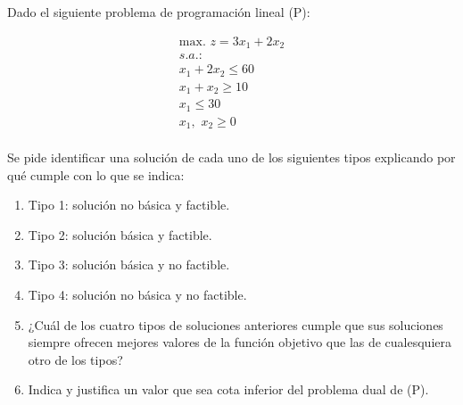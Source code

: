 Dado el siguiente problema de programación lineal (P):


\begin{equation}
\begin{split}
\mbox{max. } z = 3x_1 + 2x_2\\
s.a.:\\
x_1 + 2x_2 \leq 60\\
x_1 + x_2 \geq 10\\
x_1 \leq 30\\
x_1,\,\,x_2\geq 0\\
\end{split}
\end{equation}

Se pide identificar una solución de cada uno de los siguientes tipos explicando por qué cumple con lo que se indica:
\begin{enumerate}
    \item Tipo 1: solución no básica y factible.
    \item Tipo 2: solución básica y factible.
    \item Tipo 3: solución básica y no factible.
    \item Tipo 4: solución no básica y no factible.
    \item ¿Cuál de los cuatro tipos de soluciones anteriores cumple que sus soluciones siempre ofrecen mejores valores de la función objetivo que las de cualesquiera otro de los tipos?
    \item Indica y justifica un valor que sea cota inferior del problema dual de (P).
\end{enumerate}